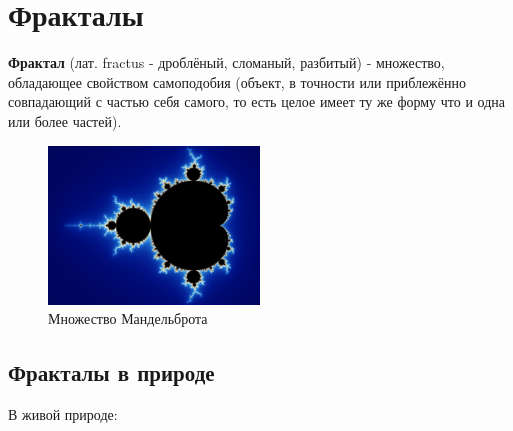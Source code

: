 \documentclass[12pt]{article}
\begin{document}
\section{Фракталы}

\textbf{Фрактал} (лат. fractus - дроблёный, сломаный, разбитый) - множество, обладающее свойством самоподобия (объект, в точности или приблежённо совпадающий с частью себя самого, то есть целое имеет ту же форму что и одна или более частей).
\begin{figure}[h!]
    \centering
    \includegraphics[width=0.5\textwidth]{10-1-1}
    \caption{\small Множество Мандельброта}
\end{figure}
\subsection{Фракталы в природе}
В живой природе:
\end{document}
